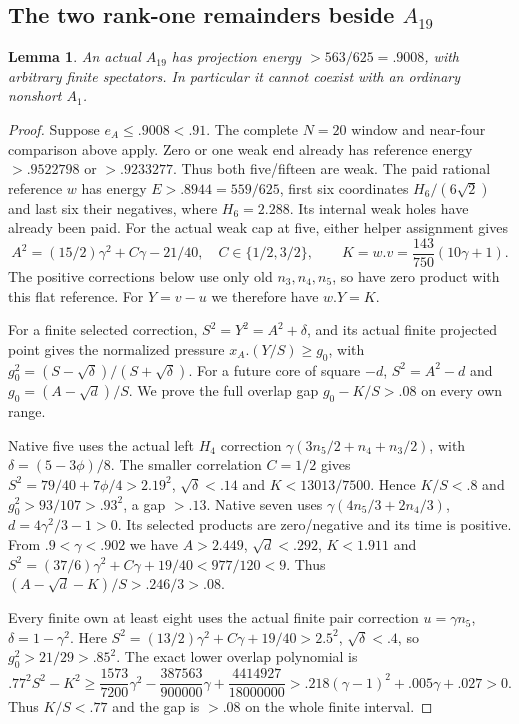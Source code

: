 \documentclass[11pt]{article}
\newtheorem{lemma}[theorem]{Lemma}
\theoremstyle{definition}
\theoremstyle{remark}
\begin{document}
\subsection[The two rank-one remainders beside A19]{The two rank-one remainders beside $A_{19}$}
\label{app:tail:A19rankone}
\begin{lemma}
\label{app:tail:lem:A19ordinary}
An actual $A_{19}$ has projection energy $>563/625=.9008$,
with arbitrary finite spectators. In particular it cannot coexist
with an ordinary nonshort $A_1$.
\end{lemma}
\begin{proof}
Suppose $e_A\le.9008<.91$. The complete $N=20$ window and near-four
comparison above apply. Zero or one weak end already has reference
energy $>.9522798$ or $>.9233277$. Thus both five/fifteen are weak.
The paid rational reference $w$ has energy $E>.8944=559/625$,
first six coordinates $H_6/(6\sqrt2)$ and last six their negatives,
where $H_6=2.288$. Its internal weak holes have already been paid.
For the actual weak cap at five, either helper assignment gives
\[
 A^2=(15/2)\gamma^2+C\gamma-21/40,\quad C\in\{1/2,3/2\},
 \qquad K=w.v={\frac{143}{750}}(10\gamma+1).
\]
The positive corrections below use only old $n_3,n_4,n_5$, so have
zero product with this flat reference. For $Y=v-u$ we therefore
have $w.Y=K$.

For a finite selected correction, $S^2=Y^2=A^2+\delta$,
and its actual finite projected point gives the normalized pressure
$x_A.(Y/S)\ge g_0$, with
$g_0^2=(S-\sqrt\delta)/(S+\sqrt\delta)$.
For a future core of square $-d$, $S^2=A^2-d$ and
$g_0=(A-\sqrt d)/S$.
We prove the full overlap gap $g_0-K/S>.08$ on every own range.

Native five uses the actual left $H_4$ correction
$\gamma(3n_5/2+n_4+n_3/2)$, with
$\delta=(5-3\phi)/8$. The smaller correlation $C=1/2$ gives
$S^2=79/40+7\phi/4>2.19^2$, $\sqrt\delta<.14$ and
$K<13013/7500$. Hence $K/S<.8$ and
$g_0^2>93/107>.93^2$, a gap $>.13$.
Native seven uses $\gamma(4n_5/3+2n_4/3)$,
$d=4\gamma^2/3-1>0$. Its selected products are zero/negative
and its time is positive. From $.9<\gamma<.902$ we have
$A>2.449$, $\sqrt d<.292$, $K<1.911$ and
$S^2=(37/6)\gamma^2+C\gamma+19/40<977/120<9$.
Thus $(A-\sqrt d-K)/S>.246/3>.08$.

Every finite own at least eight uses the actual finite pair correction
$u=\gamma n_5$, $\delta=1-\gamma^2$.
Here $S^2=(13/2)\gamma^2+C\gamma+19/40>2.5^2$,
$\sqrt\delta<.4$, so $g_0^2>21/29>.85^2$.
The exact lower overlap polynomial is
\[
 .77^2S^2-K^2\ge
 {\frac{1573}{7200}}\gamma^2-{\frac{387563}{900000}}\gamma
                +{\frac{4414927}{18000000}}
 >.218(\gamma-1)^2+.005\gamma+.027>0.
\]
Thus $K/S<.77$ and the gap is $>.08$ on the whole finite interval.


\end{proof}
\end{document}
